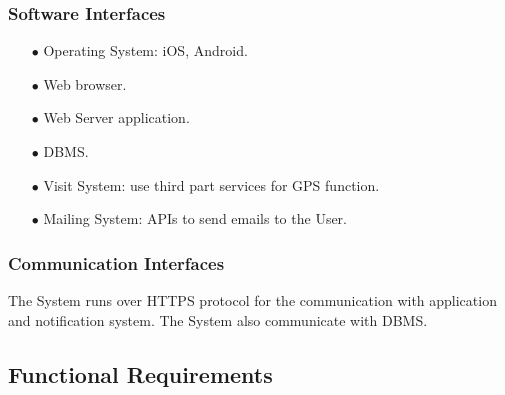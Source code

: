 \documentclass[a4paper, 12pt, oneside]{article}
\begin{document}
\subsubsection{Software Interfaces}
\begin{enumerate}
\item[$\bullet$] Operating System: iOS, Android.
\item[$\bullet$] Web browser.
\item[$\bullet$] Web Server application.
\item[$\bullet$] DBMS.
\item[$\bullet$] Visit System: use third part services for GPS function. 
\item[$\bullet$] Mailing System: APIs to send emails to the User.
\end{enumerate}

\subsubsection{Communication Interfaces}
The System runs over HTTPS protocol for the communication with application and notification system. The System also communicate with DBMS.

\subsection{Functional Requirements}
\end{document}
